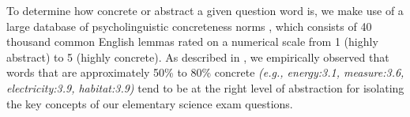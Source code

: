 To determine how concrete or abstract a given question word is, we make use of a large database of psycholinguistic concreteness norms \citep{brysbaert:2014}, which consists of 40 thousand common English lemmas rated on a numerical scale from 1 (highly abstract) to 5 (highly concrete).  As described in \citet{jansen2017framing}, we empirically observed that words that are approximately 50\% to 80\% concrete {\em (e.g., energy:3.1, measure:3.6, electricity:3.9, habitat:3.9)} tend to be at the right level of abstraction for isolating the key concepts of our elementary science exam questions.




